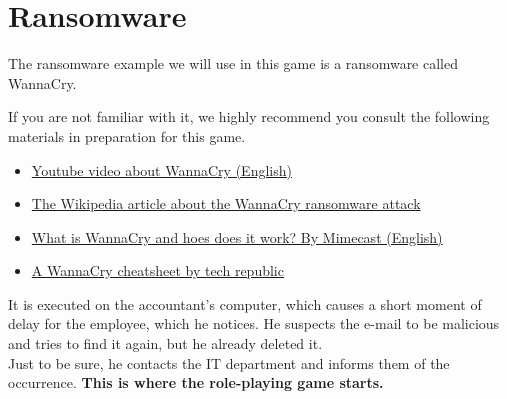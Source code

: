 \section{Ransomware}

The ransomware example we will use in this game is a ransomware called WannaCry.

\begin{hint}
If you are not familiar with it, we highly recommend you consult the following materials in preparation for this game.

    \begin{itemize}
        \item \href{https://www.youtube.com/watch?v=etPizFNPupk}{Youtube video about WannaCry (English)}
        \item \href{https://en.wikipedia.org/wiki/WannaCry_ransomware_attack}{The Wikipedia article about the WannaCry ransomware attack}
        \item \href{https://www.mimecast.com/blog/all-you-need-to-know-about-wannacry-ransomware/}{What is WannaCry and hoes does it work? By Mimecast (English)}
        \item \href{https://www.techrepublic.com/article/wannacry-the-smart-persons-guide/}{A WannaCry cheatsheet by tech republic}
    \end{itemize}
\end{hint}

It is executed on the accountant's computer, which causes a short moment of delay for the employee, which he notices.
He suspects the e-mail to be malicious and tries to find it again, but he already deleted it.
\\

Just to be sure, he contacts the IT department and informs them of the occurrence.
\textbf{This is where the role-playing game starts.}